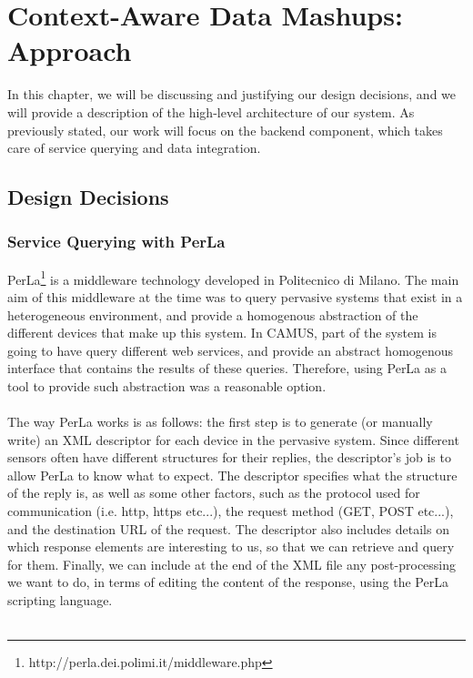 \chapter{Context-Aware Data Mashups: Approach}
\label{capitolo4}
\thispagestyle{empty}
In this chapter, we will be discussing and justifying our design decisions, and we will provide a description of the high-level architecture of our system. As previously stated, our work will focus on the backend component, which takes care of service querying and data integration.\\
\section{Design Decisions}
\subsection{Service Querying with PerLa}
PerLa\footnote{http://perla.dei.polimi.it/middleware.php}\cite{perla} is a middleware technology developed in Politecnico di Milano. The main aim of this middleware at the time was to query pervasive systems that exist in a heterogeneous environment, and provide a homogenous abstraction of the different devices that make up this system. In CAMUS, part of the system is going to have query different web services, and provide an abstract homogenous interface that contains the results of these queries. Therefore, using PerLa as a tool to provide such abstraction was a reasonable option.\\\\
The way PerLa works is as follows: the first step is to generate (or manually write) an XML descriptor for each device in the pervasive system. Since different sensors often have different structures for their replies, the descriptor's job is to allow PerLa to know what to expect. The descriptor specifies what the structure of the reply is, as well as some other factors, such as the protocol used for communication (i.e. http, https etc...), the request method (GET, POST etc...), and the destination URL of the request. The descriptor also includes details on which response elements are interesting to us, so that we can retrieve and query for them. Finally, we can include at the end of the XML file any post-processing we want to do, in terms of editing the content of the response, using the PerLa scripting language.\\\\
